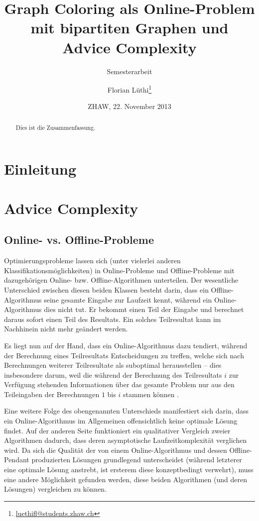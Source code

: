 \documentclass[11pt,abstracton]{scrreprt} %
\title{Graph Coloring als Online-Problem mit bipartiten Graphen und Advice Complexity}
\subtitle{Semesterarbeit}
\author{Florian Lüthi\footnote{\url{luethifl@students.zhaw.ch}}}
\date{ZHAW, 22. November 2013} %
\theoremstyle{definition}
\begin{document}
\maketitle

\begin{abstract}
Dies ist die Zusammenfassung.
\end{abstract}

\tableofcontents

\chapter{Einleitung}


\chapter{Advice Complexity}

\section{Online- vs. Offline-Probleme}

Optimierungsprobleme lassen sich (unter vielerlei anderen Klassifikationsmöglichkeiten) in Online-Probleme und Offline-Probleme mit dazugehörigen Online- bzw. Offline-Algo\-rithmen unterteilen. Der wesentliche Unterschied zwischen diesen beiden Klassen besteht darin, dass ein Offline-Algorithmus seine gesamte Eingabe zur Laufzeit kennt, während ein Online-Algorithmus dies nicht tut. Er bekommt einen Teil der Eingabe und berechnet daraus sofort einen Teil des Resultats. Ein solches Teilresultat kann im Nachhinein nicht mehr geändert werden.

Es liegt nun auf der Hand, dass ein Online-Algorithmus dazu tendiert, während der Berechnung eines Teilresultats Entscheidungen zu treffen, welche sich nach Berechnungen weiterer Teilresultate als suboptimal herausstellen -- dies insbesondere darum, weil die während der Berechnung des Teilresultats $i$ zur Verfügung stehenden Informationen über das gesamte Problem nur aus den Teileingaben der Berechnungen $1$ bis $i$ stammen können \cite{BKK}.

\bigskip
Eine weitere Folge des obengenannten Unterschieds manifestiert sich darin, dass ein Online-Algorithmus im Allgemeinen offensichtlich keine optimale Lösung findet. Auf der anderen Seite funktioniert ein qualitativer Vergleich zweier Algorithmen dadurch, dass deren asymptotische Laufzeitkomplexität verglichen wird. Da sich die Qualität der von einem Online-Algorithmus und dessen Offline-Pendant produzierten Lösungen grundlegend unterscheidet (während letzterer eine optimale Lösung anstrebt, ist ersterem diese konzeptbedingt verwehrt), muss eine andere Möglichkeit gefunden werden, diese beiden Algorithmen (und deren Lösungen) vergleichen zu können.
\end{document}
